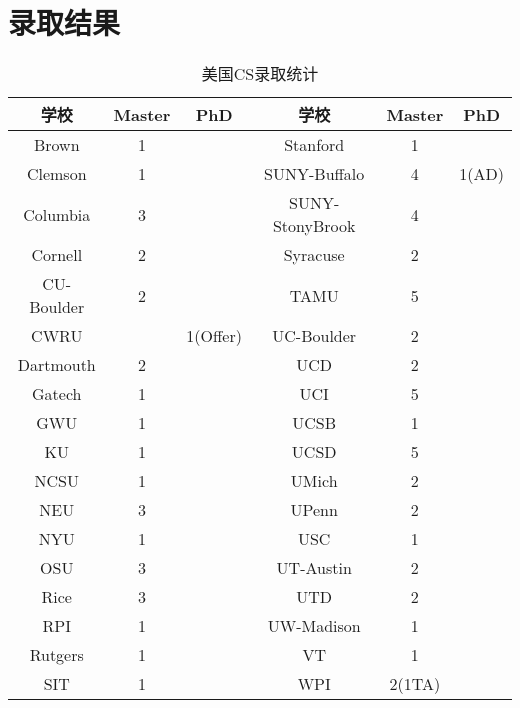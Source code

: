\chapter*{录取结果}
\pagestyle{plain}
\newpage
\begin{center}
\begin{longtable}{|c|c|c||c|c|c|}
\caption{美国CS录取统计}\\
\hline
\textbf{学校} & \textbf{Master} & \textbf{PhD} & \textbf{学校} & \textbf{Master}  & \textbf{PhD} \\ \hline
Brown & 1  & ~ & Stanford & 1 & ~ \\ \hline
Clemson & 1  & ~ & SUNY-Buffalo & 4 & 1(AD) \\ \hline
Columbia & 3 & ~ & SUNY-StonyBrook & 4 & ~ \\ \hline
Cornell	& 2 & ~ & Syracuse & 2 & ~  \\ \hline
CU-Boulder & 2 & ~ & TAMU & 5 & ~ \\ \hline
CWRU & ~ & 1(Offer) & UC-Boulder & 2 & ~ \\ \hline
Dartmouth & 2 & ~ & UCD	& 2	& ~ \\ \hline
Gatech & 1 & ~ & UCI & 5	& ~ \\ \hline
GWU	& 1 & ~ & UCSB & 1 & ~ \\ \hline
KU & 1 & ~ & UCSD & 5 & ~ \\ \hline
NCSU & 1 & ~ & UMich & 2 & ~ \\ \hline
NEU & 3 & ~ & UPenn & 2	& ~ \\ \hline
NYU	& 1 & ~ & USC	& 1	& ~ \\ \hline
OSU	& 3 & ~ & UT-Austin & 2 & ~ \\ \hline
Rice & 3 & ~ & UTD & 2	& ~ \\ \hline
RPI & 1 & ~ & UW-Madison & 1 & ~ \\ \hline
Rutgers & 1  & ~ & VT & 1 & ~ \\ \hline
SIT	& 1 & ~  & WPI & 2(1TA) & ~ \\ \hline
\end{longtable}


\end{center}
